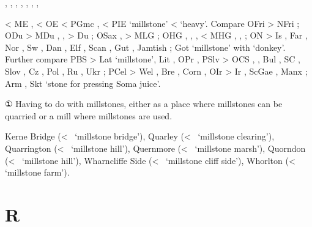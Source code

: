 \documentclass[12pt,letterpaper,oneside,article,draft]{memoir}
\begin{document}
\begin{Lemma}
\begin{Also}
	, , , , , , , 
\end{Also}
\begin{Etymology}
	< ME ,  < OE  < PGmc , 
		< PIE  ‘millstone’ <  ‘heavy’.
	Compare
	OFri  > NFri ;
	ODu  > MDu , ,  > Du ;
	OSax ,  > MLG ;
	OHG , , ,  < MHG , , ;
	ON  > Is , Far , Nor , Sw , Dan ,
		Elf , Scan , Gut , Jamtish ;
	Got   ‘millstone’ with   ‘donkey’.
	Further compare
	PBS  > Lat  ‘millstone’, Lit , OPr ,
	PSlv  > OCS  ,  ,
		Bul  , SC  , Slov , Cz ,
		Pol , Ru  , Ukr  ;
	PCel  > Wel , Bre , Corn ,
		OIr  > Ir , ScGae , Manx ;
	Arm  ,
	Skt \!  ‘stone for pressing Soma juice’.
\end{Etymology}
\begin{Definitions}
	① Having to do with millstones, either as a place where millstones can be quarried or a mill where millstones are used.	
\end{Definitions}
\begin{Examples}
	Kerne Bridge (<~ ‘millstone bridge’),
	Quarley (<~ ‘millstone clearing’),
	Quarrington (<~ ‘millstone hill’),
	Quernmore (<~ ‘millstone marsh’),
	Quorndon (<~ ‘millstone hill’),
	Wharncliffe Side (<~ ‘millstone cliff side’),
	Whorlton (<~ ‘millstone farm’).
\end{Examples}
\end{Lemma}

\section*{R}
\end{document}
